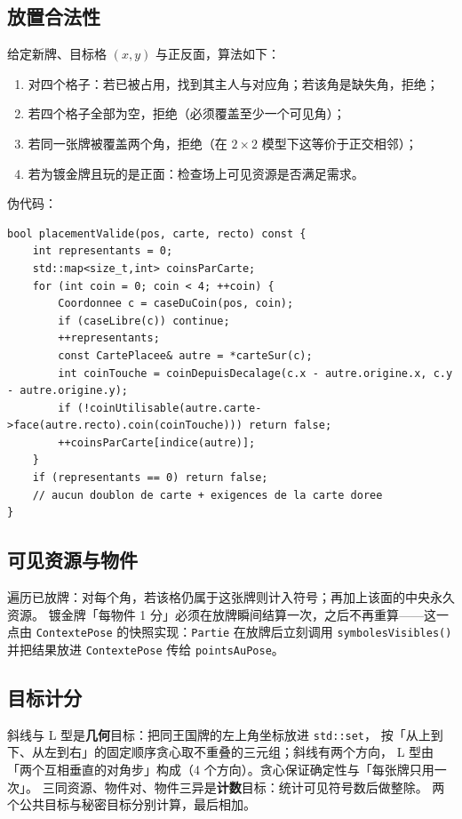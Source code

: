 \documentclass[11pt,a4paper]{ctexart}
\newcommand{\cl}[1]{\texttt{#1}}
\begin{document}
\subsection{放置合法性}
给定新牌、目标格 $(x,y)$ 与正反面，算法如下：
\begin{enumerate}
\item 对四个格子：若已被占用，找到其主人与对应角；若该角是缺失角，拒绝；
\item 若四个格子全部为空，拒绝（必须覆盖至少一个可见角）；
\item 若同一张牌被覆盖两个角，拒绝（在 $2\times2$ 模型下这等价于正交相邻）；
\item 若为镀金牌且玩的是正面：检查场上可见资源是否满足需求。
\end{enumerate}
伪代码：
\begin{lstlisting}
bool placementValide(pos, carte, recto) const {
    int representants = 0;
    std::map<size_t,int> coinsParCarte;
    for (int coin = 0; coin < 4; ++coin) {
        Coordonnee c = caseDuCoin(pos, coin);
        if (caseLibre(c)) continue;
        ++representants;
        const CartePlacee& autre = *carteSur(c);
        int coinTouche = coinDepuisDecalage(c.x - autre.origine.x, c.y - autre.origine.y);
        if (!coinUtilisable(autre.carte->face(autre.recto).coin(coinTouche))) return false;
        ++coinsParCarte[indice(autre)];
    }
    if (representants == 0) return false;
    // aucun doublon de carte + exigences de la carte doree
}
\end{lstlisting}

\subsection{可见资源与物件}
遍历已放牌：对每个角，若该格仍属于这张牌则计入符号；再加上该面的中央永久资源。
镀金牌「每物件 1 分」必须在放牌瞬间结算一次，之后不再重算——这一点由
\cl{ContextePose} 的快照实现：\cl{Partie} 在放牌后立刻调用
\cl{symbolesVisibles()} 并把结果放进 \cl{ContextePose} 传给 \cl{pointsAuPose}。

\subsection{目标计分}
斜线与 L 型是\textbf{几何}目标：把同王国牌的左上角坐标放进 \cl{std::set}，
按「从上到下、从左到右」的固定顺序贪心取不重叠的三元组；斜线有两个方向，
L 型由「两个互相垂直的对角步」构成（4 个方向）。贪心保证确定性与「每张牌只用一次」。
三同资源、物件对、物件三异是\textbf{计数}目标：统计可见符号数后做整除。
两个公共目标与秘密目标分别计算，最后相加。
\end{document}
